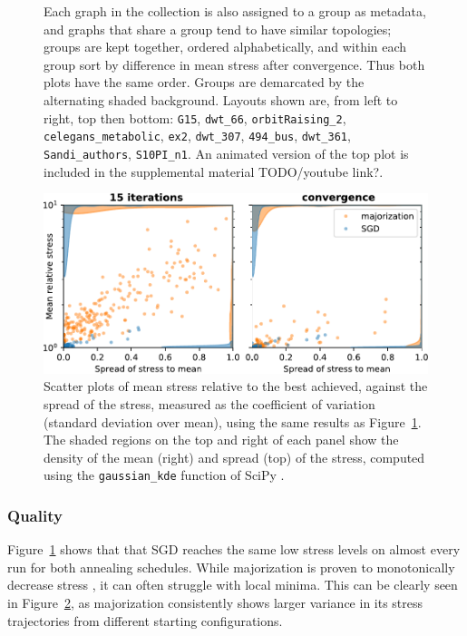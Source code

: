 \begin{figure}
{  Each graph in the collection is also assigned to a group as metadata, and graphs that share a group tend to have similar topologies; groups are kept together, ordered alphabetically, and within each group sort by difference in mean stress after convergence. Thus both plots have the same order. Groups are demarcated by the alternating shaded background. Layouts shown are, from left to right, top then bottom:
  \texttt{G15}, 
  \texttt{dwt\_66}, 
  \texttt{orbitRaising\_2}, 
  \texttt{celegans\_metabolic},
  \texttt{ex2},
  \texttt{dwt\_307},
  \texttt{494\_bus},
  \texttt{dwt\_361},
  \texttt{Sandi\_authors},
  \texttt{S10PI\_n1}.
  An animated version of the top plot is included in the supplemental material TODO/youtube link?.
  }
  \label{fig:systematic}
\end{figure}

\begin{figure}
  \centering
  \includegraphics[width=.8\textwidth]{stress/systematic_summary.pdf}
  \caption[A summary of the results in Figure~\ref{fig:systematic}]{Scatter plots of mean stress relative to the best achieved, against the spread of the stress, measured as the coefficient of variation (standard deviation over mean), using the same results as Figure~\ref{fig:systematic}.
  The shaded regions on the top and right of each panel show the density of the mean (right) and spread (top) of the stress, computed using the \texttt{gaussian\_kde} function of SciPy \cite{Virtanen2020}.
  }
  \label{fig:systematic_summary}
\end{figure}

\subsubsection{Quality}
\label{quality}
Figure~\ref{fig:systematic} shows that that SGD reaches the same low stress levels on almost every run for both annealing schedules. While majorization is proven to monotonically decrease stress \cite{Gansner2004}, 
it can often struggle with local minima. This can be clearly seen in Figure~\ref{fig:systematic_summary}, as majorization consistently shows larger variance in its stress trajectories from different starting configurations.

